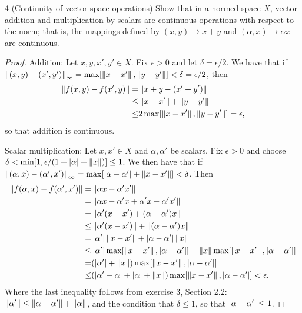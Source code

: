 \begin{exercise}{4 (Continuity of vector space operations)}
Show that in a normed space $X$, vector addition and multiplication by scalars are continuous operations with respect to the norm; that is, the mappings defined by $(x,y)\to x+y$ and $(\alpha, x)\to \alpha x$ are continuous.
\end{exercise}
\begin{proof}
Addition: Let $x,y,x',y'\in X$. Fix $\epsilon>0$ and let $\delta=\epsilon/2$. We have that if $\left\lVert (x,y)-(x',y')\right\rVert_\infty =\max[\left\lVert x-x'\right\rVert, \left\lVert y-y'\right\rVert] <\delta=\epsilon/2$, then 
\begin{align*}
\left\lVert f(x,y)-f(x',y)\right\rVert 
=&\left\lVert x+y-(x'+y')\right\rVert\\
\leq& \left\lVert x-x'\right\rVert+\left\lVert y-y'\right\rVert\\
\leq& 2\max[\left\lVert x-x'\right\rVert, \left\lVert y-y'\right\rVert] =\epsilon,
\end{align*}
so that addition is continuous.

Scalar multiplication: Let $x,x'\in X$ and $\alpha,\alpha'$ be scalars. Fix $\epsilon>0$ and choose $\delta<\min[1,\epsilon/(1+\left\lvert \alpha\right\rvert+\left\lVert x\right\rVert)]\leq 1$. We then have that if $\left\lVert (\alpha, x)-(\alpha',x')\right\rVert_\infty =\max[\left\lvert \alpha-\alpha'\right\rvert+\left\lVert x-x'\right\rVert]<\delta$. Then 
\begin{align*}
    \left\lVert f(\alpha,x)-f(\alpha',x')\right\rVert 
    =& \left\lVert \alpha x-\alpha'x'\right\rVert\\
    =& \left\lVert \alpha x-\alpha' x+\alpha' x-\alpha'x'\right\rVert\\
    =& \left\lVert \alpha' (x-x')+(\alpha-\alpha')x\right\rVert\\
    \leq& \left\lVert \alpha' (x-x')\right\rVert+\left\lVert (\alpha-\alpha')x\right\rVert\\
    =& \left\lvert \alpha'\right\rvert\left\lVert x-x'\right\rVert+\left\lvert \alpha-\alpha'\right\rvert\left\lVert x\right\rVert\\
    \leq& \left\lvert \alpha'\right\rvert\max[\left\lVert x-x'\right\rVert, \left\lvert \alpha-\alpha'\right\rvert]+\left\lVert x\right\rVert\max[\left\lVert x-x'\right\rVert, \left\lvert \alpha-\alpha'\right\rvert]\\
    =& (\left\lvert \alpha'\right\rvert+\left\lVert x\right\rVert)\max[\left\lVert x-x'\right\rVert, \left\lvert \alpha-\alpha'\right\rvert]\\
    \leq& (\left\lvert \alpha'-\alpha\right\rvert+\left\lvert \alpha\right\rvert+\left\lVert x\right\rVert)\max[\left\lVert x-x'\right\rVert, \left\lvert \alpha-\alpha'\right\rvert]<\epsilon.
\end{align*}
Where the last inequality follows from exercise 3, Section 2.2: $\left\lVert \alpha'\right\rVert \leq\left\lVert \alpha-\alpha'\right\rVert+\left\lVert \alpha\right\rVert$, and the condition that $\delta\leq 1$, so that $\left\lvert \alpha-\alpha'\right\rvert\leq 1$.
\end{proof}


